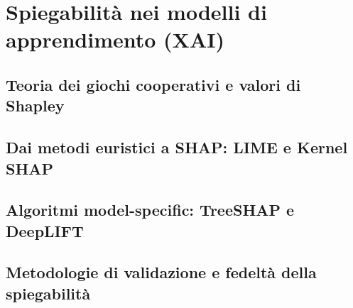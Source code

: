 \section{Spiegabilità nei modelli di apprendimento (XAI)}
\label{sec:lit_explainability}

\subsection{Teoria dei giochi cooperativi e valori di Shapley}
\label{subsec:shapley_values}

\subsection{Dai metodi euristici a SHAP: LIME e Kernel SHAP}
\label{subsec:lime_and_kernel_shap}

\subsection{Algoritmi model-specific: TreeSHAP e DeepLIFT}
\label{subsec:model_specific_shap}

\subsection{Metodologie di validazione e fedeltà della spiegabilità}
\label{subsec:xai_validation}